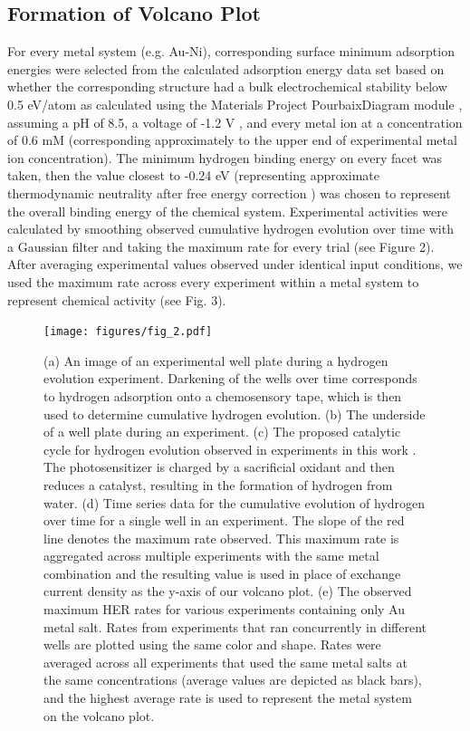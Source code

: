 \documentclass[preprint,12pt]{elsarticle}
\begin{document}
\subsection{Formation of Volcano Plot}\label{Section:Experimental/Volcano}
For every metal system (e.g. Au-Ni), corresponding surface minimum adsorption energies were selected from the calculated adsorption energy data set based on whether the corresponding structure had a bulk electrochemical stability below 0.5 eV/atom as calculated using the Materials Project PourbaixDiagram module \cite{singh2017electrochemical,persson2012prediction,patel2019efficient}, assuming a pH of 8.5, a voltage of -1.2 V \cite{lowry2005single}, and every metal ion at a concentration of 0.6 mM (corresponding approximately to the upper end of experimental metal ion concentration). The minimum hydrogen binding energy on every facet was taken, then the value closest to -0.24 eV (representing approximate thermodynamic neutrality after free energy correction \cite{norskov2005trends}) was chosen to represent the overall binding energy of the chemical system. Experimental activities were calculated by smoothing observed cumulative hydrogen evolution over time with a Gaussian filter and taking the maximum rate for every trial (see Figure 2). After averaging experimental values observed under identical input conditions, we used the maximum rate across every experiment within a metal system to represent chemical activity (see Fig. 3). 

\begin{figure}[h]
\centering
    \texttt{[image: figures/fig\_2.pdf]}
\caption{(a) An image of an experimental well plate during a hydrogen evolution experiment. Darkening of the wells over time corresponds to hydrogen adsorption onto a chemosensory tape, which is then used to determine cumulative hydrogen evolution. (b) The underside of a well plate during an experiment. (c) The proposed catalytic cycle for hydrogen evolution observed in experiments in this work \cite{lopato2020parallelized}. The photosensitizer is charged by a sacrificial oxidant and then reduces a catalyst, resulting in the formation of hydrogen from water. (d) Time series data for the cumulative evolution of hydrogen over time for a single well in an experiment. The slope of the red line denotes the maximum rate observed. This maximum rate is aggregated across multiple experiments with the same metal combination and the resulting value is used in place of exchange current density as the y-axis of our volcano plot. (e) The observed maximum HER rates for various experiments containing only Au metal salt. Rates from experiments that ran concurrently in different wells are plotted using the same color and shape. Rates were averaged across all experiments that used the same metal salts at the same concentrations (average values are depicted as black bars), and the highest average rate is used to represent the metal system on the volcano plot.
}
\end{figure}
\end{document}
